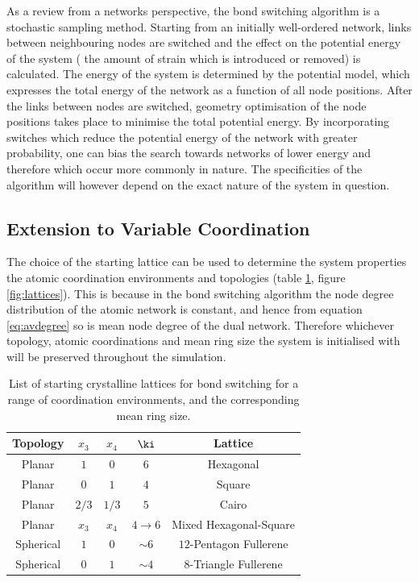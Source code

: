 As a review from a networks perspective, the bond switching algorithm is a stochastic sampling method.
Starting from an initially well\--ordered network, links between neighbouring nodes are switched and the effect on the potential energy of the system (\ie{} the amount of strain which is introduced or removed) is calculated.
The energy of the system is determined by the potential model, which expresses the total energy of the network as a function of all node positions.
After the links between nodes are switched, geometry optimisation of the node positions takes place to minimise the total potential energy.
By incorporating switches which reduce the potential energy of the network with greater probability, one can bias the search towards networks of lower energy and therefore which occur more commonly in nature.
The specificities of the algorithm will however depend on the exact nature of the system in question.

\subsection{Extension to Variable Coordination}

The choice of the starting lattice can be used to determine the system properties \ie{} the atomic coordination environments and topologies (table \ref{tab:lattices}, figure \ref{fig:lattices}).
This is because in the bond switching algorithm the node degree distribution of the atomic network is constant, and hence from equation \eqref{eq:avdegree} so is mean node degree of the dual network.
Therefore whichever topology, atomic coordinations and mean ring size the system is initialised with will be preserved throughout the simulation.

\begin{table}
   \centering
     \caption{List of starting crystalline lattices for bond switching for a range of coordination environments, and the corresponding mean ring size.}
     \label{tab:lattices}
     \begin{tabular}{ccccc}
     \toprule
     Topology & $x_3$ & $x_4$ & $\ki$ & Lattice\\
     \midrule
        Planar & $1$ & $0$ & $6$ & Hexagonal \\
        Planar & $0$ & $1$ & $4$ & Square \\
        Planar & $2/3$ & $1/3$ & $5$ & Cairo \\
        Planar & $x_3$ & $x_4$ & $4\rightarrow6$ & Mixed Hexagonal\--Square \\
        Spherical & $1$ & $0$ & $\sim 6$ & $12$-Pentagon Fullerene \\
        Spherical & $0$ & $1$ & $\sim 4$ & $8$-Triangle Fullerene \\
        \bottomrule
     \end{tabular}
\end{table}

